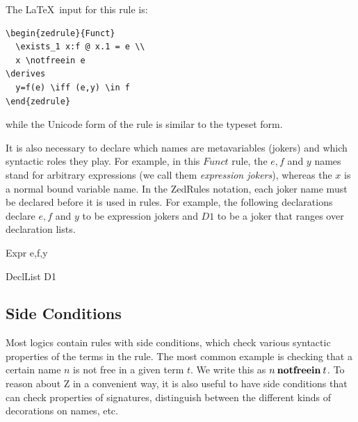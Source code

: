 \documentclass{entcs}
\begin{document}
The \LaTeX\ input for this rule is:
\begin{verbatim}
\begin{zedrule}{Funct}
  \exists_1 x:f @ x.1 = e \\
  x \notfreein e
\derives
  y=f(e) \iff (e,y) \in f
\end{zedrule}
\end{verbatim}
while the Unicode form of the rule is similar to the typeset form.

It is also necessary to declare which names are metavariables
(jokers) and which syntactic roles they play.  For example, in
this $Funct$ rule, the $e,f$ and $y$ names stand for arbitrary
expressions (we call them \emph{expression jokers}), whereas the $x$
is a normal bound variable name.  In the ZedRules notation, each
joker name must be declared before it is used in rules.  For example,
the following declarations declare $e,f$ and $y$ to be expression
jokers and $D1$ to be a joker that ranges over declaration lists.

\begin{zedjoker}{Expr} e,f,y \end{zedjoker}
\begin{zedjoker}{DeclList} D1 \end{zedjoker}


\subsection{Side Conditions}

Most logics contain rules with side conditions, which check various
syntactic properties of the terms in the rule.  The most common
example is checking that a certain name $n$ is not free in a given
term $t$.  We write this as $n \mathbin{\mathop{\mathstrut{\mbox{\textbf{notfreein}}}}\nolimits} t$.  To reason about Z in a
convenient way, it is also useful to have side conditions that can
check properties of signatures, distinguish between the different
kinds of decorations on names, etc.
\end{document}
